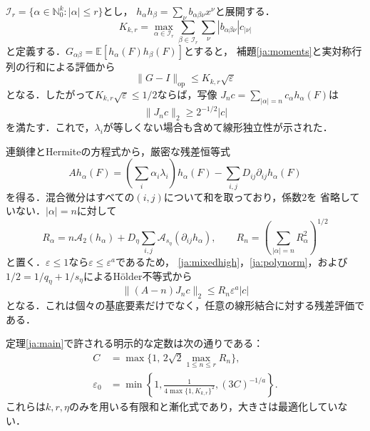 \documentclass[12pt]{amsart}
\theoremstyle{definition}
\theoremstyle{remark}
\numberwithin{equation}{section}
\newcommand{\N}{\mathbb{N}}
\newcommand{\E}{\mathbb E}
\newcommand{\eps}{\varepsilon}
\theoremstyle{plain}
\begin{document}
$\mathcal I_r=\{\alpha\in\N_0^k:|\alpha|\leq r\}$とし，
$h_\alpha h_\beta=\sum_\nu b_{\alpha\beta\nu}x^\nu$と展開する．
\begin{equation}\label{ja:Gconstant}
 K_{k,r}=\max_{\alpha\in\mathcal I_r}
       \sum_{\beta\in\mathcal I_r}\sum_\nu
                       |b_{\alpha\beta\nu}|c_{|\nu|}
\end{equation}
と定義する．$G_{\alpha\beta}=\E[h_\alpha(F)h_\beta(F)]$とすると，
補題\ref{ja:moments}と実対称行列の行和による評価から
\begin{equation}\label{ja:Gram}
 \|G-I\|_{\mathrm{op}}\leq K_{k,r}\sqrt\eps
\end{equation}
となる．したがって$K_{k,r}\sqrt\eps\leq1/2$ならば，写像
$J_n c=\sum_{|\alpha|=n}c_\alpha h_\alpha(F)$は
\begin{equation}\label{ja:Jbound}
 \|J_nc\|_2\geq2^{-1/2}|c|
\end{equation}
を満たす．これで，$\lambda_i$が等しくない場合も含めて線形独立性が示された．

連鎖律とHermiteの方程式から，厳密な残差恒等式
\begin{equation}\label{ja:residual}
 A h_\alpha(F)=\left(\sum_i\alpha_i\lambda_i\right)h_\alpha(F)
                   -\sum_{i,j}D_{ij}\partial_{ij}h_\alpha(F)
\end{equation}
を得る．混合微分はすべての$(i,j)$について和を取っており，係数$2$を
省略していない．$|\alpha|=n$に対して
\[
 R_\alpha=n\mathcal A_2(h_\alpha)
       +D_\eta\sum_{i,j}\mathcal A_{s_\eta}(\partial_{ij}h_\alpha),
 \qquad R_n=\left(\sum_{|\alpha|=n}R_\alpha^2\right)^{1/2}
\]
と置く．$\eps\leq1$なら$\eps\leq\eps^a$であるため，
\eqref{ja:mixedhigh}，\eqref{ja:polynorm}，および
$1/2=1/q_\eta+1/s_\eta$によるH\"older不等式から
\begin{equation}\label{ja:spanresidual}
 \|(A-n)J_nc\|_2\leq R_n\eps^a|c|
\end{equation}
となる．これは個々の基底要素だけでなく，任意の線形結合に対する残差評価である．

定理\ref{ja:main}で許される明示的な定数は次の通りである：
\begin{equation}\label{ja:finalconstants}
 \begin{split}
 C&=\max\{1,\,2\sqrt2\max_{1\leq n\leq r}R_n\},\\
 \eps_0&=\min\left\{1,\frac1{4\max\{1,K_{k,r}\}^2},
                         (3C)^{-1/a}\right\}.
 \end{split}
\end{equation}
これらは$k,r,\eta$のみを用いる有限和と漸化式であり，大きさは最適化していない．
\end{document}
